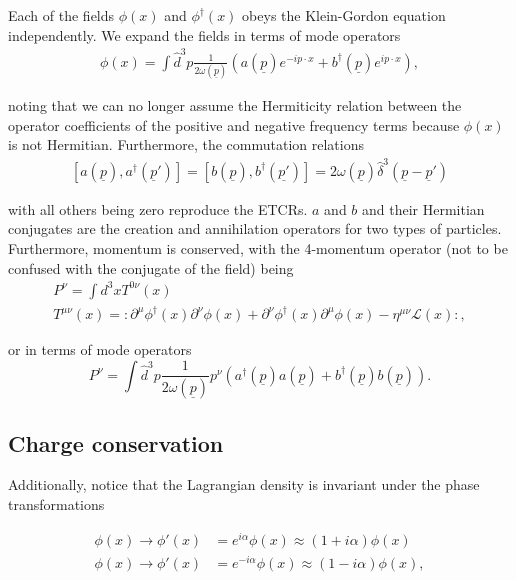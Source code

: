 \documentclass{article}
\newcommand{\normord}[1]{:\mathrel{#1}:}
\begin{document}
Each of the fields $\phi(x)$ and $\phi^\dagger(x)$ obeys the Klein-Gordon equation independently. We expand the fields in terms of mode operators
\begin{equation}
\begin{aligned}
    \phi(x) = \int \hat{d}^3p \frac{1}{2\omega(\underline{p})} \left(a(\underline{p})e^{-ip\cdot x} + b^\dagger(\underline{p})e^{ip\cdot x}\right),
\end{aligned}
\end{equation}

noting that we can no longer assume the Hermiticity relation between the operator coefficients of the positive and negative frequency terms because $\phi(x)$ is not Hermitian. Furthermore, the commutation relations 
\begin{equation}
\begin{aligned}
    [a(\underline{p}), a^\dagger(\underline{p}')] = [b(\underline{p}), b^\dagger(\underline{p'})] = 2\omega(\underline{p}) \hat{\delta}^3(\underline{p}-\underline{p}')
\end{aligned}
\end{equation}

with all others being zero reproduce the ETCRs. $a$ and $b$ and their Hermitian conjugates are the creation and annihilation operators for two types of particles. Furthermore, momentum is conserved, with the 4-momentum operator (not to be confused with the conjugate of the field) being 
\begin{gather}
    P^\nu = \int d^3x T^{0\nu}(x)\\
    T^{\mu\nu}(x) = \normord{\partial^\mu \phi^\dagger(x) \partial^\nu \phi(x) + \partial^\nu \phi^\dagger(x) \partial^\mu \phi(x) - \eta^{\mu\nu} \mathcal{L}(x)},
\end{gather}

or in terms of mode operators
\begin{equation}
    P^\nu = \int \hat{d}^3p \frac{1}{2\omega(\underline{p})}p^\nu \left(a^\dagger(\underline{p}) a(\underline{p}) + b^\dagger(\underline{p})b(\underline{p})\right).
\end{equation}

\subsection{Charge conservation}

Additionally, notice that the Lagrangian density is invariant under the phase transformations

\begin{equation}
\begin{aligned}
    \phi(x) \rightarrow \phi'(x)&=e^{i\alpha}\phi(x) \approx (1+i\alpha)\phi(x) \\
    \phi(x) \rightarrow \phi'(x)&=e^{-i\alpha}\phi(x) \approx (1-i\alpha)\phi(x),
\end{aligned}
\end{equation}
\end{document}
